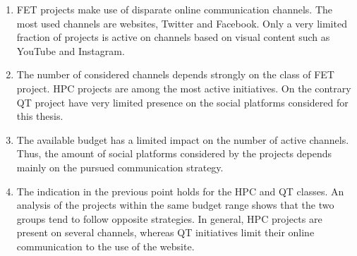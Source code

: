 \begin{enumerate}
 \item FET projects make use of disparate online communication channels. The most used channels are websites, Twitter and Facebook. Only a very limited fraction of projects is active on channels based on visual content such as YouTube and Instagram.
 \item The number of considered channels depends strongly on the class of FET project. HPC projects are among the most active initiatives. On the contrary QT project have very limited presence on the social platforms considered for this thesis.
 \item The available budget has a limited impact on the number of active channels. Thus, the amount of social platforms considered by the projects depends mainly on the pursued communication strategy.
 \item The indication in the previous point holds for the HPC and QT classes. An analysis of the projects within the same budget range shows that the two groups tend to follow opposite strategies. In general, HPC projects are present on several channels, whereas QT initiatives limit their online communication to the use of the website.       
\end{enumerate}